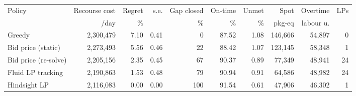 \begin{tabular}{@{}lrrrrrrrrr@{}}\toprule
Policy & Recourse cost & Regret & s.e. & Gap closed & On-time & Unmet & Spot & Overtime & LPs \\
 & \EUR{}/day & \% & & \% & \% & \% & pkg-eq & labour u. & \\ \midrule
Greedy & 2{,}300{,}479 & 7.10 & 0.41 & 0 & 87.52 & 1.08 & 146{,}666 & 54{,}897 & 0 \\
Bid price (static) & 2{,}273{,}493 & 5.56 & 0.46 & 22 & 88.42 & 1.07 & 123{,}145 & 58{,}348 & 1 \\
Bid price (re-solve) & 2{,}205{,}156 & 2.35 & 0.45 & 67 & 90.37 & 0.89 & 77{,}349 & 48{,}941 & 24 \\
Fluid LP tracking & 2{,}190{,}863 & 1.53 & 0.48 & 79 & 90.94 & 0.91 & 64{,}586 & 48{,}982 & 24 \\
Hindsight LP & 2{,}116{,}083 & 0.00 & 0.00 & 100 & 91.54 & 0.61 & 47{,}906 & 46{,}302 & 1 \\
\bottomrule\end{tabular}

